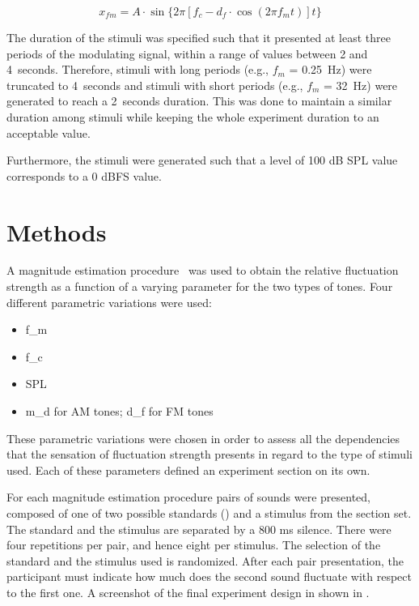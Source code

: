 \documentclass[../main.tex]{subfiles}
\begin{document}
\begin{equation}
  x_{fm} = A \cdot \sin \{2 \pi [f_c - d_f \cdot \cos(2 \pi f_m t)] t \}
  \label{eq:fm}
\end{equation}

The duration of the stimuli was specified such that it presented at least three
periods of the modulating signal, within a range of values between 2 and
4~seconds. Therefore, stimuli with long periods (e.g., $f_m$ = 0.25~Hz) were
truncated to 4~seconds and stimuli with short periods (e.g., $f_m$ = 32~Hz) were
generated to reach a 2~seconds duration. This was done to maintain a similar
duration among stimuli while keeping the whole experiment duration to an
acceptable value.

Furthermore, the stimuli were generated such that a level of 100 dB SPL value
corresponds to a 0 dBFS value.

\section{Methods}
\label{sec:methods}


A magnitude estimation procedure~\cite[pp.~9]{Fastl2007Psychoacoustics} was used
to obtain the relative fluctuation strength as a function of a varying parameter
for the two types of tones. Four different parametric variations were used:
\begin{itemize}
  \item \Gls{f_m}
  \item \Gls{f_c}
  \item \Gls{SPL}
  \item \Gls{m_d} for \gls{AM} tones; \gls{d_f} for \gls{FM} tones
\end{itemize}
These parametric variations were chosen in order to assess all the dependencies
that the sensation of fluctuation strength presents in regard to the type of
stimuli used. Each of these parameters defined an experiment section on its own.

For each magnitude estimation procedure pairs of sounds were presented, composed
of one of two possible standards () and a stimulus from the
section set. The standard and the stimulus are separated by a 800 ms silence.
There were four repetitions per pair, and hence eight per stimulus. The
selection of the standard and the stimulus used is randomized. After each
pair presentation, the participant must indicate how much does the second
sound fluctuate with respect to the first one. A screenshot of the final
experiment design in shown in .
\end{document}
